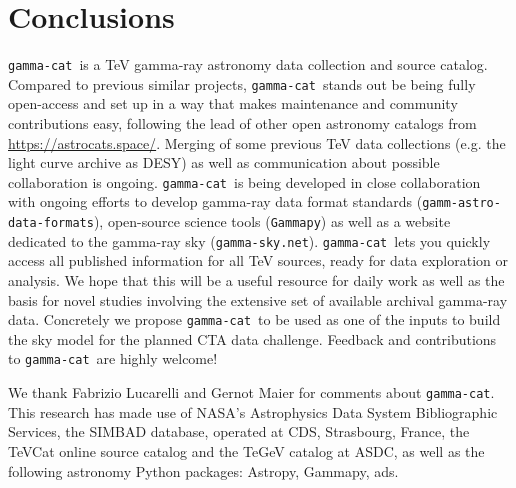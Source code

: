 \documentclass[11pt,twoside]{article}
\newcommand{\gammacat}{\texttt{gamma-cat}}
\newcommand{\gammapy}{\texttt{Gammapy}}
\newcommand{\gadf}{\texttt{gamm-astro-data-formats}}
\newcommand{\gammasky}{\texttt{gamma-sky.net}}
\newcommand{\tevcat}{\texttt{TeVCat}}
\newcommand{\tegev}{\texttt{TeGeV}}
\newcommand{\desylc}{\url{https://astro.desy.de/gamma_astronomy/magic/projects/light_curve_archive/}}
\newcommand{\astrocats}{\url{https://astrocats.space/}}
\begin{document}
% 

\section{Conclusions}
\label{sec:conclusions}




\gammacat\ is a TeV gamma-ray astronomy data collection and source catalog.
Compared to previous similar projects, \gammacat\ stands out be being fully
open-access and set up in a way that makes maintenance and community
contributions easy, following the lead of other open astronomy catalogs from
\astrocats. Merging of some previous TeV data collections (e.g. the light curve
archive as DESY) as well as communication about possible collaboration is
ongoing. \gammacat\ is being developed in close collaboration with ongoing
efforts to develop gamma-ray data format standards (\gadf), open-source science
tools (\gammapy) as well as a website dedicated to the gamma-ray sky
(\gammasky). \gammacat\ lets you quickly access all published information for
all TeV sources, ready for data exploration or analysis. We hope that this will
be a useful resource for daily work as well as the basis for novel studies
involving the extensive set of available archival gamma-ray data. Concretely we
propose \gammacat\ to be used as one of the inputs to build the sky model for
the planned CTA data challenge. Feedback and contributions to \gammacat\ are
highly welcome!


\acknowledgements We thank Fabrizio Lucarelli and Gernot Maier for comments
about \gammacat. This research has made use of NASA's Astrophysics Data System
Bibliographic Services, the SIMBAD database, operated at CDS, Strasbourg,
France, the TeVCat online source catalog and the TeGeV catalog at ASDC, as well
as the following astronomy Python packages: Astropy, Gammapy, ads.


\end{document}
